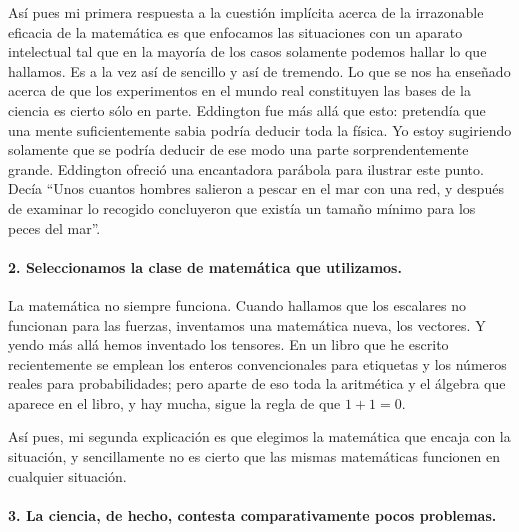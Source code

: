 \documentclass[a4paper, 12pt]{article}
\begin{document}
 

Así pues mi primera respuesta a la cuestión implícita acerca de la irrazonable eficacia de la matemática es que enfocamos las situaciones con un aparato intelectual tal que en la mayoría de los casos solamente podemos hallar lo que hallamos.  Es a la vez así de sencillo y así de tremendo. Lo que se nos ha enseñado acerca de que los experimentos en el mundo real constituyen las bases de la ciencia es cierto sólo en parte. Eddington fue más allá que esto: pretendía que una mente suficientemente sabia podría deducir toda la física. Yo estoy sugiriendo solamente que se podría deducir de ese modo una parte sorprendentemente grande. Eddington ofreció una encantadora parábola para ilustrar este punto. Decía ``Unos cuantos hombres salieron a pescar en el mar con una red, y después de examinar lo recogido concluyeron que existía un tamaño mínimo para los peces del mar''.

 

\paragraph*{2. Seleccionamos la clase de matemática que utilizamos.}

 La matemática no siempre funciona. Cuando hallamos que los escalares no funcionan para las fuerzas, inventamos una matemática nueva, los vectores. Y yendo más allá hemos inventado los tensores. En un libro que he escrito recientemente  se emplean los enteros convencionales para etiquetas y los números reales para probabilidades; pero aparte de eso toda la aritmética y el álgebra que aparece en el libro, y hay mucha, sigue la regla de que $1+1=0$.

 

Así pues, mi segunda explicación es que elegimos la matemática que encaja con la situación, y sencillamente no es cierto que las mismas matemáticas funcionen en cualquier situación.

 

\paragraph*{3. La ciencia, de hecho, contesta comparativamente pocos problemas.}
\end{document}
